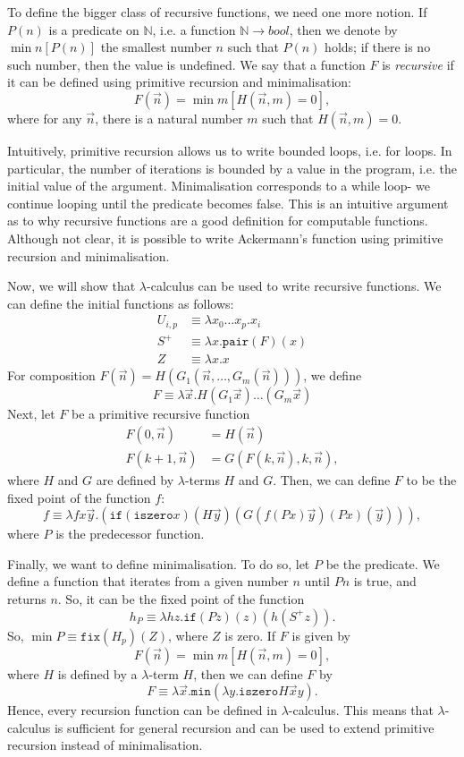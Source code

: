 \documentclass[a4paper, openany]{memoir}
\theoremstyle{definition}
\begin{document}
    To define the bigger class of recursive functions, we need one more notion. If $P(n)$ is a predicate on $\mathbb{N}$, i.e. a function $\mathbb{N} \to bool$, then we denote by $\min n[P(n)]$ the smallest number $n$ such that $P(n)$ holds; if there is no such number, then the value is undefined. We say that a function $F$ is \emph{recursive} if it can be defined using primitive recursion and minimalisation:
    \[F(\vec{n}) = \min m[H(\vec{n}, m) = 0],\]
    where for any $\vec{n}$, there is a natural number $m$ such that $H(\vec{n}, m) = 0$.

    Intuitively, primitive recursion allows us to write bounded loops, i.e. for loops. In particular, the number of iterations is bounded by a value in the program, i.e. the initial value of the argument. Minimalisation corresponds to a while loop- we continue looping until the predicate becomes false. This is an intuitive argument as to why recursive functions are a good definition for computable functions. Although not clear, it is possible to write Ackermann's function using primitive recursion and minimalisation.

    Now, we will show that $\lambda$-calculus can be used to write recursive functions. We can define the initial functions as follows:
    \begin{align*}
        U_{i, p} &\equiv \lambda x_0 \dots x_p. x_i \\
        S^+ &\equiv \lambda x.\texttt{pair}(F)(x) \\
        Z &\equiv \lambda x.x
    \end{align*}
    For composition $F(\vec{n}) = H(G_1(\vec{n}, \dots, G_m(\vec{n})))$, we define
    \[F \equiv \lambda \vec{x}.H(G_1\vec{x}) \dots (G_m \vec{x})\]
    Next, let $F$ be a primitive recursive function
    \begin{align*}
        F(0, \vec{n}) &= H(\vec{n}) \\
        F(k+1, \vec{n}) &= G(F(k, \vec{n}), k, \vec{n}),
    \end{align*}
    where $H$ and $G$ are defined by $\lambda$-terms $H$ and $G$. Then, we can define $F$ to be the fixed point of the function $f$:
    \[f \equiv \lambda f x \vec{y}. (\texttt{if}(\texttt{iszero} x)(H \vec{y})(G(f(Px) \vec{y})(Px)(\vec{y}))),\]
    where $P$ is the predecessor function.

    Finally, we want to define minimalisation. To do so, let $P$ be the predicate. We define a function that iterates from a given number $n$ until $P n$ is true, and returns $n$. So, it can be the fixed point of the function
    \[h_P \equiv \lambda hz.\texttt{if}(P z)(z)(h(S^+ z)).\]
    So, $\min P \equiv \texttt{fix}(H_p)(Z)$, where $Z$ is zero. If $F$ is given by
    \[F(\vec{n}) = \min m[H(\vec{n}, m) = 0],\]
    where $H$ is defined by a $\lambda$-term $H$, then we can define $F$ by
    \[F \equiv \lambda \vec{x}.\texttt{min}(\lambda y.\texttt{iszero} H \vec{x} y).\]
    Hence, every recursion function can be defined in $\lambda$-calculus. This means that $\lambda$-calculus is sufficient for general recursion and can be used to extend primitive recursion instead of minimalisation.
\end{document}
